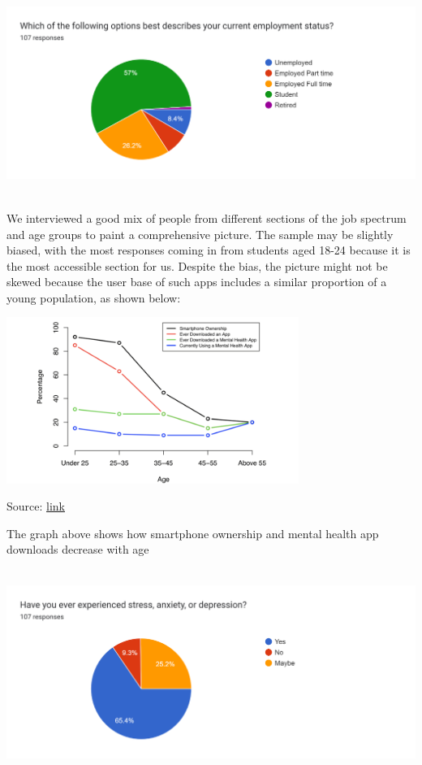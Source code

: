 \documentclass[manuscript,screen,review]{acmart}
\begin{document}
\includegraphics[width=6.26806in,height=2.63889in]{vertopal.com_Survey analysis/vertopal_0d4ab446a1ae41f4824d7f0aaede9ca1/media/image2.png}

We interviewed a good mix of people from different sections of the job
spectrum and age groups to paint a comprehensive picture. The sample may
be slightly biased, with the most responses coming in from students aged
18-24 because it is the most accessible section for us. Despite the
bias, the picture might not be skewed because the user base of such apps
includes a similar proportion of a young population, as shown below:

\includegraphics[width=3.74872in,height=2.12522in]{vertopal.com_Survey analysis/vertopal_0d4ab446a1ae41f4824d7f0aaede9ca1/media/image3.png}

Source:
\href{https://www.researchgate.net/figure/Mobile-phone-ownership-app-downloads-mental-health-app-downloads-and-mental-health-app_fig2_328373517}{link}

The graph above shows how smartphone ownership and mental health app
downloads decrease with age

\includegraphics[width=6.26806in,height=2.63889in]{vertopal.com_Survey analysis/vertopal_0d4ab446a1ae41f4824d7f0aaede9ca1/media/image4.png}
\end{document}
